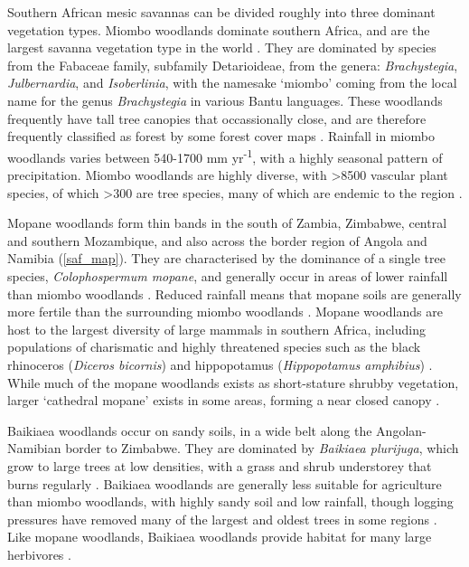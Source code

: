 \begin{refsection}
Southern African mesic savannas can be divided roughly into three dominant vegetation types. Miombo woodlands dominate southern Africa, and are the largest savanna vegetation type in the world \citep{Ryan2011}. They are dominated by species from the Fabaceae family, subfamily Detarioideae, from the genera: \textit{Brachystegia}, \textit{Julbernardia}, and \textit{Isoberlinia}, with the namesake `miombo' coming from the local name for the genus \textit{Brachystegia} in various Bantu languages. These woodlands frequently have tall tree canopies that occassionally close, and are therefore frequently classified as forest by some forest cover maps \citep{Hansen2013}. Rainfall in miombo woodlands varies between 540-1700 mm yr\textsuperscript{-1}, with a highly seasonal pattern of precipitation. Miombo woodlands are highly diverse, with >8500 vascular plant species, of which >300 are tree species, many of which are endemic to the region \citep{Frost1996}.

Mopane woodlands form thin bands in the south of Zambia, Zimbabwe, central and southern Mozambique, and also across the border region of Angola and Namibia (\autoref{saf_map}). They are characterised by the dominance of a single tree species, \textit{Colophospermum mopane}, and generally occur in areas of lower rainfall than miombo woodlands \citep{Palgrave2003}. Reduced rainfall means that mopane soils are generally more fertile than the surrounding miombo woodlands \citep{Makhado2014}. Mopane woodlands are host to the largest diversity of large mammals in southern Africa, including populations of charismatic and highly threatened species such as the black rhinoceros (\textit{Diceros bicornis}) and hippopotamus (\textit{Hippopotamus amphibius}) \citep{Mittermeier2003}. While much of the mopane woodlands exists as short-stature shrubby vegetation, larger `cathedral mopane' exists in some areas, forming a near closed canopy \citep{Makhado2014}.

Baikiaea woodlands occur on sandy soils, in a wide belt along the Angolan-Namibian border to Zimbabwe. They are dominated by \textit{Baikiaea plurijuga}, which grow to large trees at low densities, with a grass and shrub understorey that burns regularly \citep{Werger1978}. Baikiaea woodlands are generally less suitable for agriculture than miombo woodlands, with highly sandy soil and low rainfall, though logging pressures have removed many of the largest and oldest trees in some regions \citep{}. Like mopane woodlands, Baikiaea woodlands provide habitat for many large herbivores \citep{}.



\end{refsection}
